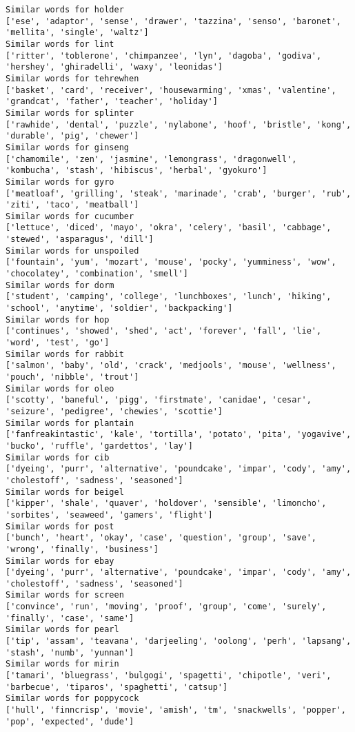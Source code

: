 \documentclass[11pt]{article}
\begin{document}
\begin{Verbatim}[commandchars=\\\{\}]
Similar words for holder
['ese', 'adaptor', 'sense', 'drawer', 'tazzina', 'senso', 'baronet', 'mellita', 'single', 'waltz']
Similar words for lint
['ritter', 'toblerone', 'chimpanzee', 'lyn', 'dagoba', 'godiva', 'hershey', 'ghiradelli', 'waxy', 'leonidas']
Similar words for tehrewhen
['basket', 'card', 'receiver', 'housewarming', 'xmas', 'valentine', 'grandcat', 'father', 'teacher', 'holiday']
Similar words for splinter
['rawhide', 'dental', 'puzzle', 'nylabone', 'hoof', 'bristle', 'kong', 'durable', 'pig', 'chewer']
Similar words for ginseng
['chamomile', 'zen', 'jasmine', 'lemongrass', 'dragonwell', 'kombucha', 'stash', 'hibiscus', 'herbal', 'gyokuro']
Similar words for gyro
['meatloaf', 'grilling', 'steak', 'marinade', 'crab', 'burger', 'rub', 'ziti', 'taco', 'meatball']
Similar words for cucumber
['lettuce', 'diced', 'mayo', 'okra', 'celery', 'basil', 'cabbage', 'stewed', 'asparagus', 'dill']
Similar words for unspoiled
['fountain', 'yum', 'mozart', 'mouse', 'pocky', 'yumminess', 'wow', 'chocolatey', 'combination', 'smell']
Similar words for dorm
['student', 'camping', 'college', 'lunchboxes', 'lunch', 'hiking', 'school', 'anytime', 'soldier', 'backpacking']
Similar words for hop
['continues', 'showed', 'shed', 'act', 'forever', 'fall', 'lie', 'word', 'test', 'go']
Similar words for rabbit
['salmon', 'baby', 'old', 'crack', 'medjools', 'mouse', 'wellness', 'pouch', 'nibble', 'trout']
Similar words for oleo
['scotty', 'baneful', 'pigg', 'firstmate', 'canidae', 'cesar', 'seizure', 'pedigree', 'chewies', 'scottie']
Similar words for plantain
['fanfreakintastic', 'kale', 'tortilla', 'potato', 'pita', 'yogavive', 'bucko', 'ruffle', 'gardettos', 'lay']
Similar words for cib
['dyeing', 'purr', 'alternative', 'poundcake', 'impar', 'cody', 'amy', 'cholestoff', 'sadness', 'seasoned']
Similar words for beigel
['kipper', 'shale', 'quaver', 'holdover', 'sensible', 'limoncho', 'sorbites', 'seaweed', 'gamers', 'flight']
Similar words for post
['bunch', 'heart', 'okay', 'case', 'question', 'group', 'save', 'wrong', 'finally', 'business']
Similar words for ebay
['dyeing', 'purr', 'alternative', 'poundcake', 'impar', 'cody', 'amy', 'cholestoff', 'sadness', 'seasoned']
Similar words for screen
['convince', 'run', 'moving', 'proof', 'group', 'come', 'surely', 'finally', 'case', 'same']
Similar words for pearl
['tip', 'assam', 'teavana', 'darjeeling', 'oolong', 'perh', 'lapsang', 'stash', 'numb', 'yunnan']
Similar words for mirin
['tamari', 'bluegrass', 'bulgogi', 'spagetti', 'chipotle', 'veri', 'barbecue', 'tiparos', 'spaghetti', 'catsup']
Similar words for poppycock
['hull', 'finncrisp', 'movie', 'amish', 'tm', 'snackwells', 'popper', 'pop', 'expected', 'dude']

\end{Verbatim}
\end{document}
